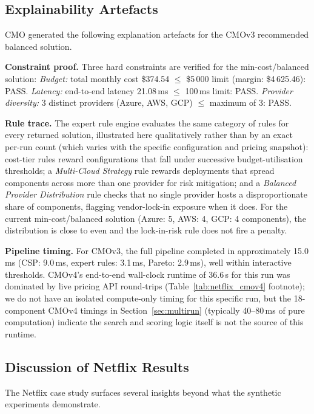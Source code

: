 \documentclass[journal]{IEEEtran}
\newcommand{\cmo}{CMO\xspace}
\newcommand{\cmothree}{CMOv3\xspace}
\newcommand{\cmofour}{CMOv4\xspace}
\begin{document}
\subsection{Explainability Artefacts}
\label{sec:netflix_explain}

\cmo generated the following explanation artefacts for the \cmothree recommended
balanced solution.

\textbf{Constraint proof.}
Three hard constraints are verified for the min-cost/balanced solution:
\textit{Budget:} total monthly cost \$374.54 $\le$ \$5\,000 limit (margin:
\$4\,625.46): PASS. \textit{Latency:} end-to-end latency 21.08\,ms $\le$
100\,ms limit: PASS. \textit{Provider diversity:} 3 distinct providers
(Azure, AWS, GCP) $\le$ maximum of 3: PASS.

\textbf{Rule trace.}
The expert rule engine evaluates the same category of rules for every
returned solution, illustrated here qualitatively rather than by an exact
per-run count (which varies with the specific configuration and pricing
snapshot): cost-tier rules reward configurations that fall under successive
budget-utilisation thresholds; a \textit{Multi-Cloud Strategy} rule rewards
deployments that spread components across more than one provider for risk
mitigation; and a \textit{Balanced Provider Distribution} rule checks that no
single provider hosts a disproportionate share of components, flagging
vendor-lock-in exposure when it does. For the current min-cost/balanced
solution (Azure: 5, AWS: 4, GCP: 4 components), the distribution is close to
even and the lock-in-risk rule does not fire a penalty.

\textbf{Pipeline timing.}
For \cmothree, the full pipeline completed in approximately 15.0\,ms (CSP:
9.0\,ms, expert rules: 3.1\,ms, Pareto: 2.9\,ms), well within interactive
thresholds. \cmofour's end-to-end wall-clock runtime of 36.6\,s for this run
was dominated by live pricing API round-trips (Table~\ref{tab:netflix_cmov4}
footnote); we do not have an isolated compute-only timing for this specific
run, but the 18-component \cmofour timings in Section~\ref{sec:multirun}
(typically 40--80\,ms of pure computation) indicate the search and scoring
logic itself is not the source of this runtime.

\subsection{Discussion of Netflix Results}
\label{sec:netflix_discussion}

The Netflix case study surfaces several insights beyond what the synthetic
experiments demonstrate.
\end{document}
